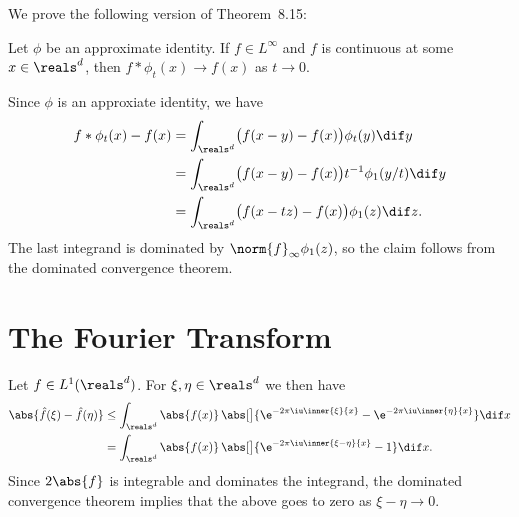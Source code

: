 \documentclass[article, a4paper, 11pt, oneside]{memoir}
\numberwithin{equation}{chapter}
\newenvironment{displaytheorem}{%
	\begin{displayquote}\itshape%
}{%
	\end{displayquote}%
}
\theoremstyle{nonumberplain}
\begin{document}
\begin{remarkbreak}
	\label{rem:approx-identity-pointwise}
	We prove the following version of Theorem~8.15:
	\begin{displaytheorem}
		Let $\phi$ be an approximate identity. If $f \in L^\infty$ and $f$ is continuous at some $x \in \reals^d$, then $f * \phi_t(x) \to f(x)$ as $t \to 0$.
	\end{displaytheorem}
	Since $\phi$ is an approxiate identity, we have
	\begin{align*}
		f * \phi_t(x) - f(x)
			&= \int_{\reals^d} \bigl( f(x-y) - f(x) \bigr) \phi_t(y) \dif y \\
			&= \int_{\reals^d} \bigl( f(x-y) - f(x) \bigr) t^{-1} \phi_1(y/t) \dif y \\
			&= \int_{\reals^d} \bigl( f(x-tz) - f(x) \bigr) \phi_1(z) \dif z.
	\end{align*}
	The last integrand is dominated by $\norm{f}_\infty \phi_1(z)$, so the claim follows from the dominated convergence theorem.
\end{remarkbreak}


\section{The Fourier Transform}

\begin{remarkbreak}
	Let $f \in L^1(\reals^d)$. For $\xi, \eta \in \reals^d$ we then have
	\begin{align*}
		\abs{ \hat f(\xi) - \hat f(\eta) }
			&\leq \int_{\reals^d} \abs{f(x)} \, \abs[\big]{ \e^{-2\pi \iu \inner{\xi}{x}} - \e^{-2\pi \iu \inner{\eta}{x}} } \dif x \\
			&= \int_{\reals^d} \abs{f(x)} \, \abs[\big]{ \e^{-2\pi \iu \inner{\xi-\eta}{x}} - 1} \dif x.
	\end{align*}
	Since $2\abs{f}$ is integrable and dominates the integrand, the dominated convergence theorem implies that the above goes to zero as $\xi-\eta \to 0$.
\end{remarkbreak}
\end{document}
